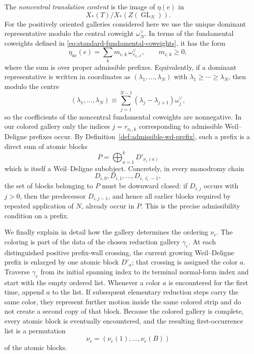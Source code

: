 \documentclass[12pt]{article}
\theoremstyle{definition}
\theoremstyle{remark}
\DeclareMathOperator{\GL}{GL}
\begin{document}
The \emph{noncentral translation content} is the image of $\eta(e)$ in
\[
 X_*(T)/X_*(Z(\GL_N)).
\]
For the positively oriented galleries considered here we use the unique
dominant representative modulo the central coweight $\omega_N^\vee$.  In
terms of the fundamental coweights defined in
\eqref{eq:standard-fundamental-coweights}, it has the form
\begin{equation}\label{eq:edge-noncentral-translation-content}
 \eta_{\mathrm{nc}}(e)
 =\sum_k m_{e,k}\,
   \omega_{r_{\nu_e,k}}^\vee,
 \qquad m_{e,k}\geq0,
\end{equation}
where the sum is over proper admissible prefixes.  Equivalently, if a dominant
representative is written in coordinates as
$(\lambda_1,\ldots,\lambda_N)$ with
$\lambda_1\geq\cdots\geq\lambda_N$, then modulo the centre
\[
 (\lambda_1,\ldots,\lambda_N)
 \equiv
 \sum_{j=1}^{N-1}(\lambda_j-\lambda_{j+1})\omega_j^\vee,
\]
so the coefficients of the noncentral fundamental coweights are nonnegative.
In our colored gallery only the indices \(j=r_{\nu_e,k}\) corresponding to
admissible Weil--Deligne prefixes occur.  By
Definition~\ref{def:admissible-wd-prefix}, such a prefix is a direct sum of
atomic blocks
\[
 P=\bigoplus_{a=1}^kD'_{\nu_e(a)}
\]
which is itself a Weil--Deligne subobject.  Concretely, in every monodromy
chain
\[
 D_{i,0},D_{i,1},\ldots,D_{i,\ell_i-1},
\]
the set of blocks belonging to \(P\) must be downward closed: if
\(D_{i,j}\) occurs with \(j>0\), then the predecessor
\(D_{i,j-1}\), and hence all earlier blocks required by repeated application
of \(N\), already occur in \(P\).  This is the precise admissibility
condition on a prefix.

We finally explain in detail how the gallery determines the ordering
\(\nu_e\).  The coloring is part of the data of the chosen reduction gallery
\(\gamma_e\).  At each distinguished positive prefix-wall crossing, the
current growing Weil--Deligne prefix is enlarged by one atomic block
\(D'_a\); that crossing is assigned the color \(a\).  Traverse
\(\gamma_e\) from its initial spanning index to its terminal normal-form
index and start with the empty ordered list.  Whenever a color \(a\) is
encountered for the first time, append \(a\) to the list.  If subsequent
elementary reduction steps carry the same color, they represent further
motion inside the same colored strip and do not create a second copy of that
block.  Because the colored gallery is complete, every atomic block is
eventually encountered, and the resulting first-occurrence list is a
permutation
\[
 \nu_e=(\nu_e(1),\ldots,\nu_e(B))
\]
of the atomic blocks.
\end{document}
